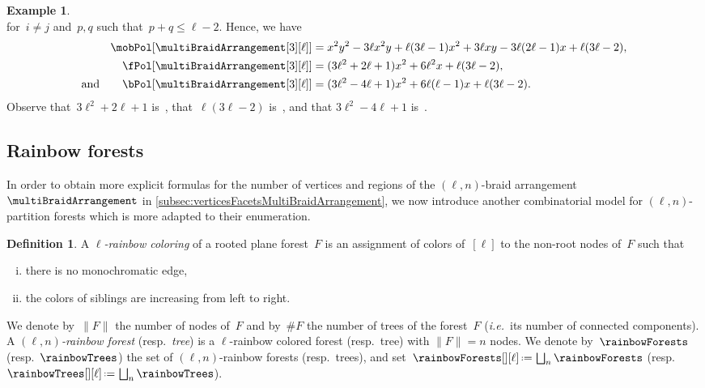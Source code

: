 \documentclass{amsart}
\newcommand{\darkblue}{\color{darkblue}} %
\newcommand{\vincenti}[1]{\todo[color=blue!30, inline]{\rm #1 \\ \hfill --- V.}}
\theoremstyle{definition}
\newtheorem{definition}[theorem]{Definition}
\newtheorem{example}[theorem]{Example}
\newcommand{\eqdef}{\mbox{\,\raisebox{0.2ex}{\scriptsize\ensuremath{\mathrm:}}\ensuremath{=}\,}} %
\newcommand{\ie}{\textit{i.e.}~} %
\newcommand{\defn}[1]{\textsl{\darkblue #1}} %
\newcommand{\OEIS}[1]{\cite[{\rm \href{http://oeis.org/#1}{\texttt{#1}}}]{OEIS}}
\begin{document}
\begin{example}
\[\]
for~$i \ne j$ and~$p, q$ such that~$p + q \le \ell-2$.
Hence, we have
\begin{align*}
\mobPol[{\multiBraidArrangement[3][\ell]}] & = x^2 y^2 - 3 \ell x^2 y + \ell (3 \ell - 1) x^2 + 3 \ell x y - 3 \ell (2 \ell - 1) x + \ell (3 \ell - 2) , \\
\fPol[{\multiBraidArrangement[3][\ell]}] & = (3 \ell^2 + 2 \ell + 1) x^2 + 6 \ell^2 x + \ell (3 \ell - 2), \\
\text{and}\qquad
\bPol[{\multiBraidArrangement[3][\ell]}] & = (3 \ell^2 - 4 \ell + 1) x^2 + 6 \ell (\ell - 1) x + \ell (3 \ell - 2).
\end{align*}
Observe that~$3 \ell^2 + 2 \ell + 1$ is~\OEIS{A056109}, that~$\ell (3 \ell - 2)$ is~\OEIS{A000567}, and that ${3 \ell^2 - 4 \ell + 1}$ is~\OEIS{A045944}.
\end{example}


\subsection{Rainbow forests}
\label{subsec:rainbowForests}

In order to obtain more explicit formulas for the number of vertices and regions of the $(\ell,n)$-braid arrangement~$\multiBraidArrangement$ in \cref{subsec:verticesFacetsMultiBraidArrangement}, we now introduce another combinatorial model for $(\ell,n)$-partition forests which is more adapted to their enumeration.

\begin{definition}
\label{def:rainbowForest}
A \defn{$\ell$-rainbow coloring} of a rooted plane forest~$F$ is an assignment of colors of~$[\ell]$ to the non-root nodes of~$F$ such that
\begin{enumerate}[(i)]
\item there is no monochromatic edge,
\item the colors of siblings are increasing from left to right.
\end{enumerate}
We denote by~$\|F\|$ the number of nodes of~$F$ and by~$\#F$ the number of trees of the forest~$F$ (\ie its number of connected components).
A \defn{$(\ell,n)$-rainbow forest} (resp.~\defn{tree}) is a \mbox{$\ell$-rainbow} colored forest (resp.~tree) with $\|F\| = n$ nodes.
We denote by~$\rainbowForests$ (resp.~$\rainbowTrees$) the set of $(\ell,n)$-rainbow forests (resp.~trees), and set~$\rainbowForests[][\ell] \eqdef \bigsqcup_n \rainbowForests$ (resp.~$\rainbowTrees[][\ell] \eqdef \bigsqcup_n \rainbowTrees$).
\end{definition}
\end{document}
